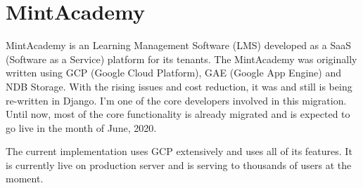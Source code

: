 \section{MintAcademy}

MintAcademy is an Learning Management Software (LMS) developed as a SaaS
(Software as a Service) platform for its tenants. The MintAcademy was
originally written using GCP (Google Cloud Platform), GAE (Google App Engine)
and NDB Storage. With the rising issues and cost reduction, it was and still
is being re-written in Django. I'm one of the core developers involved in this
migration. Until now, most of the core functionality is already migrated
and is expected to go live in the month of June, 2020.

The current implementation uses GCP extensively and uses all of its features.
It is currently live on production server and is serving to thousands of users
at the moment.
